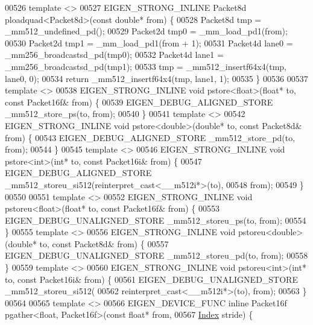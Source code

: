 \begin{DoxyCode}
00526 \textcolor{keyword}{template} <>
00527 EIGEN\_STRONG\_INLINE Packet8d ploadquad<Packet8d>(\textcolor{keyword}{const} \textcolor{keywordtype}{double}* from) \{
00528   Packet8d tmp = \_mm512\_undefined\_pd();
00529   Packet2d tmp0 = \_mm\_load\_pd1(from);
00530   Packet2d tmp1 = \_mm\_load\_pd1(from + 1);
00531   Packet4d lane0 = \_mm256\_broadcastsd\_pd(tmp0);
00532   Packet4d lane1 = \_mm256\_broadcastsd\_pd(tmp1);
00533   tmp = \_mm512\_insertf64x4(tmp, lane0, 0);
00534   \textcolor{keywordflow}{return} \_mm512\_insertf64x4(tmp, lane1, 1);
00535 \}
00536 
00537 \textcolor{keyword}{template} <>
00538 EIGEN\_STRONG\_INLINE \textcolor{keywordtype}{void} pstore<float>(\textcolor{keywordtype}{float}* to, \textcolor{keyword}{const} Packet16f& from) \{
00539   EIGEN\_DEBUG\_ALIGNED\_STORE \_mm512\_store\_ps(to, from);
00540 \}
00541 \textcolor{keyword}{template} <>
00542 EIGEN\_STRONG\_INLINE \textcolor{keywordtype}{void} pstore<double>(\textcolor{keywordtype}{double}* to, \textcolor{keyword}{const} Packet8d& from) \{
00543   EIGEN\_DEBUG\_ALIGNED\_STORE \_mm512\_store\_pd(to, from);
00544 \}
00545 \textcolor{keyword}{template} <>
00546 EIGEN\_STRONG\_INLINE \textcolor{keywordtype}{void} pstore<int>(\textcolor{keywordtype}{int}* to, \textcolor{keyword}{const} Packet16i& from) \{
00547   EIGEN\_DEBUG\_ALIGNED\_STORE \_mm512\_storeu\_si512(reinterpret\_cast<\_\_m512i*>(to),
00548                                                 from);
00549 \}
00550 
00551 \textcolor{keyword}{template} <>
00552 EIGEN\_STRONG\_INLINE \textcolor{keywordtype}{void} pstoreu<float>(\textcolor{keywordtype}{float}* to, \textcolor{keyword}{const} Packet16f& from) \{
00553   EIGEN\_DEBUG\_UNALIGNED\_STORE \_mm512\_storeu\_ps(to, from);
00554 \}
00555 \textcolor{keyword}{template} <>
00556 EIGEN\_STRONG\_INLINE \textcolor{keywordtype}{void} pstoreu<double>(\textcolor{keywordtype}{double}* to, \textcolor{keyword}{const} Packet8d& from) \{
00557   EIGEN\_DEBUG\_UNALIGNED\_STORE \_mm512\_storeu\_pd(to, from);
00558 \}
00559 \textcolor{keyword}{template} <>
00560 EIGEN\_STRONG\_INLINE \textcolor{keywordtype}{void} pstoreu<int>(\textcolor{keywordtype}{int}* to, \textcolor{keyword}{const} Packet16i& from) \{
00561   EIGEN\_DEBUG\_UNALIGNED\_STORE \_mm512\_storeu\_si512(
00562       reinterpret\_cast<\_\_m512i*>(to), from);
00563 \}
00564 
00565 \textcolor{keyword}{template} <>
00566 EIGEN\_DEVICE\_FUNC \textcolor{keyword}{inline} Packet16f pgather<float, Packet16f>(\textcolor{keyword}{const} \textcolor{keywordtype}{float}* from,
00567                                                              \hyperlink{namespace_eigen_a62e77e0933482dafde8fe197d9a2cfde}{Index} stride) \{

\end{DoxyCode}

